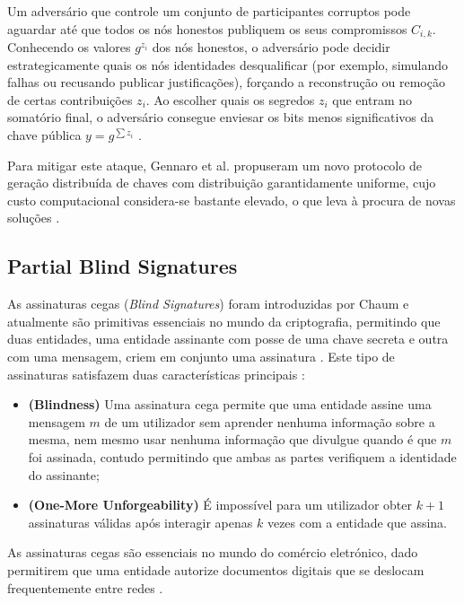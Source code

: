 Um adversário que controle um conjunto de participantes corruptos pode aguardar até que todos os nós honestos publiquem os seus compromissos $C_{i,k}$. Conhecendo os valores $g^{z_i}$ dos nós honestos, o adversário pode decidir estrategicamente quais os nós identidades desqualificar (por exemplo, simulando falhas ou recusando publicar justificações), forçando a reconstrução ou remoção de certas contribuições $z_i$. Ao escolher quais os segredos $z_i$ que entram no somatório final, o adversário consegue enviesar os bits menos significativos da chave pública $y = g^{\sum z_i}$ \cite{gennaro2007secure}.

Para mitigar este ataque, Gennaro et al. propuseram um novo protocolo de geração distribuída de chaves com distribuição garantidamente uniforme, cujo custo computacional considera-se bastante elevado, o que leva à procura de novas soluções \cite{das2023scalable_dkg, kate2026scalable}.

\subsection{Partial Blind Signatures}

As assinaturas cegas (\textit{Blind Signatures}) foram introduzidas por Chaum \cite{chaum1982blind} e atualmente são primitivas essenciais no mundo da criptografia, permitindo que duas entidades, uma entidade assinante com posse de uma chave secreta e outra com uma mensagem, criem em conjunto uma assinatura \cite{kastner2022abeokamoto}. Este tipo de assinaturas satisfazem duas características principais \cite{ieee4533332_blindsig}:

\begin{itemize}
    \item \textbf{(Blindness)} Uma assinatura cega permite que uma entidade assine uma mensagem $m$ de um utilizador sem aprender nenhuma informação sobre a mesma, nem mesmo usar nenhuma informação que divulgue quando é que $m$ foi assinada, contudo permitindo que ambas as partes verifiquem a identidade do assinante;
    \item \textbf{(One-More Unforgeability)} É impossível para um utilizador obter $k+1$ assinaturas válidas após interagir apenas $k$ vezes com a entidade que assina.
\end{itemize}

As assinaturas cegas são essenciais no mundo do comércio eletrónico, dado permitirem que uma entidade autorize documentos digitais que se deslocam frequentemente entre redes \cite{pointcheval2000security}.

